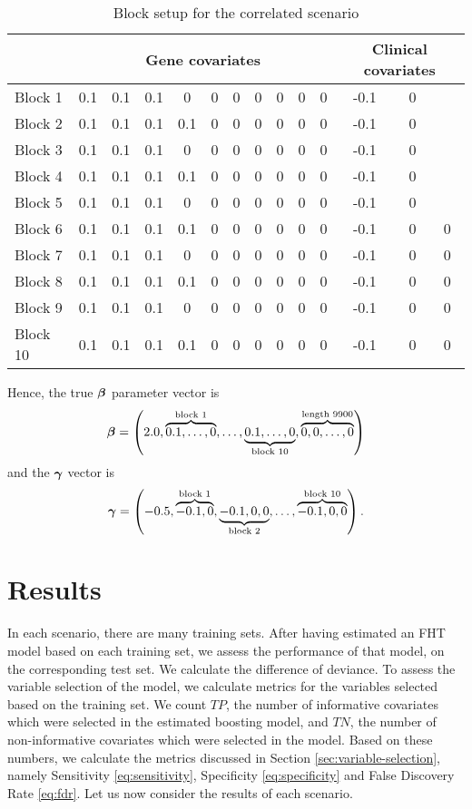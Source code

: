 \begin{table}
\caption{Block setup for the correlated scenario}
\label{table:block-setup}
\centering
\begin{tabular}{l|cccccccccc|ccc|}
\toprule
 & \multicolumn{10}{c}{Gene covariates} & \multicolumn{3}{c}{Clinical covariates}  \\
\hline
Block 1 &  0.1 & 0.1 & 0.1 & 0   & 0 & 0 & 0 & 0 & 0 & 0 & -0.1 & 0 &   \\
Block 2 &  0.1 & 0.1 & 0.1 & 0.1 & 0 & 0 & 0 & 0 & 0 & 0 & -0.1 & 0 &   \\
Block 3 &  0.1 & 0.1 & 0.1 & 0   & 0 & 0 & 0 & 0 & 0 & 0 & -0.1 & 0 &   \\
Block 4 &  0.1 & 0.1 & 0.1 & 0.1 & 0 & 0 & 0 & 0 & 0 & 0 & -0.1 & 0 &   \\
Block 5 &  0.1 & 0.1 & 0.1 & 0   & 0 & 0 & 0 & 0 & 0 & 0 & -0.1 & 0 &   \\
Block 6 &  0.1 & 0.1 & 0.1 & 0.1 & 0 & 0 & 0 & 0 & 0 & 0 & -0.1 & 0 & 0 \\
Block 7 &  0.1 & 0.1 & 0.1 & 0   & 0 & 0 & 0 & 0 & 0 & 0 & -0.1 & 0 & 0 \\
Block 8 &  0.1 & 0.1 & 0.1 & 0.1 & 0 & 0 & 0 & 0 & 0 & 0 & -0.1 & 0 & 0 \\
Block 9 &  0.1 & 0.1 & 0.1 & 0   & 0 & 0 & 0 & 0 & 0 & 0 & -0.1 & 0 & 0 \\
Block 10&  0.1 & 0.1 & 0.1 & 0.1 & 0 & 0 & 0 & 0 & 0 & 0 & -0.1 & 0 & 0 \\
\bottomrule
\end{tabular}
\end{table}
Hence, the true $\boldsymbol{\beta}$ parameter vector is
\begin{equation*}
    \boldsymbol{\beta}=\left(2.0, \overbrace{0.1, \ldots, 0}^{\text{block 1}}, \ldots, \underbrace{0.1, \ldots, 0}_{\text{block 10}}, \overbrace{0, 0, \ldots, 0}^{\text{length 9900}}\right)
\end{equation*}
and the $\boldsymbol{\gamma}$ vector is
\begin{align*}
    \boldsymbol{\gamma}=\left(-0.5, \overbrace{-0.1, 0}^{\text{block 1}}, \underbrace{-0.1, 0, 0}_{\text{block 2}}, \ldots, \overbrace{-0.1, 0, 0}^{\text{block 10}}\right).
\end{align*}


\section{Results}
In each scenario, there are many training sets.
After having estimated an FHT model based on each training set, we assess the performance of that model, on the corresponding test set.
We calculate the difference of deviance.
To assess the variable selection of the model, we calculate metrics for the variables selected based on the training set.
We count $TP$, the number of informative covariates which were selected in the estimated boosting model, and $TN$, the number of non-informative covariates which were selected in the model.
Based on these numbers, we calculate the metrics discussed in Section \ref{sec:variable-selection}, namely Sensitivity \eqref{eq:sensitivity}, Specificity \eqref{eq:specificity} and False Discovery Rate \eqref{eq:fdr}.
Let us now consider the results of each scenario.

